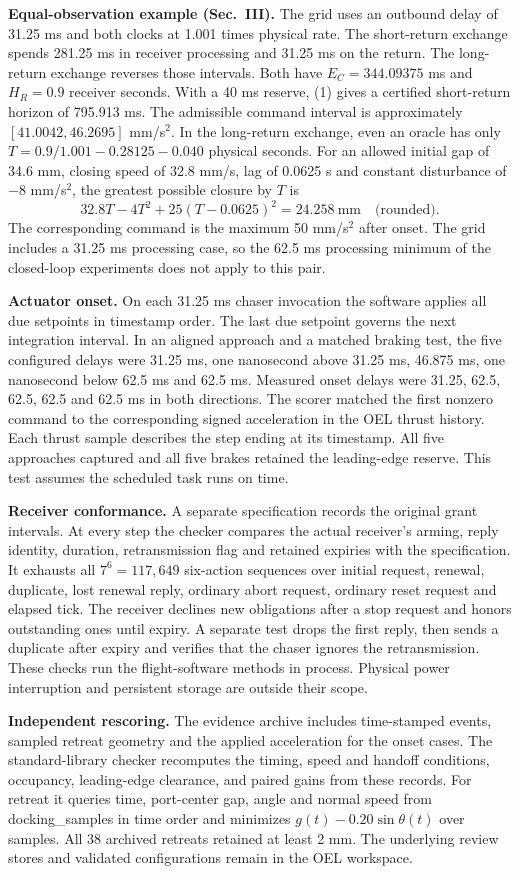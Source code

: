 \documentclass[10pt,letterpaper]{article}
\begin{document}
\textbf{Equal-observation example (Sec.~III).} The grid uses an outbound delay of 31.25 ms and both clocks at 1.001 times physical rate. The short-return exchange spends 281.25 ms in receiver processing and 31.25 ms on the return. The long-return exchange reverses those intervals. Both have $E_C=344.09375$ ms and $H_R=0.9$ receiver seconds. With a 40 ms reserve, (1) gives a certified short-return horizon of 795.913 ms. The admissible command interval is approximately $[41.0042,46.2695]$ mm/s$^2$. In the long-return exchange, even an oracle has only $T=0.9/1.001-0.28125-0.040$ physical seconds. For an allowed initial gap of 34.6 mm, closing speed of 32.8 mm/s, lag of 0.0625 s and constant disturbance of $-8$ mm/s$^2$, the greatest possible closure by $T$ is
\[
32.8T-4T^2+25(T-0.0625)^2=24.258~\mathrm{mm}\quad\text{(rounded)}.
\]
The corresponding command is the maximum 50 mm/s$^2$ after onset. The grid includes a 31.25 ms processing case, so the 62.5 ms processing minimum of the closed-loop experiments does not apply to this pair.

\textbf{Actuator onset.} On each 31.25 ms chaser invocation the software applies all due setpoints in timestamp order. The last due setpoint governs the next integration interval. In an aligned approach and a matched braking test, the five configured delays were 31.25 ms, one nanosecond above 31.25 ms, 46.875 ms, one nanosecond below 62.5 ms and 62.5 ms. Measured onset delays were 31.25, 62.5, 62.5, 62.5 and 62.5 ms in both directions. The scorer matched the first nonzero command to the corresponding signed acceleration in the OEL thrust history. Each thrust sample describes the step ending at its timestamp. All five approaches captured and all five brakes retained the leading-edge reserve. This test assumes the scheduled task runs on time.

\textbf{Receiver conformance.} A separate specification records the original grant intervals. At every step the checker compares the actual receiver's arming, reply identity, duration, retransmission flag and retained expiries with the specification. It exhausts all $7^6=117{,}649$ six-action sequences over initial request, renewal, duplicate, lost renewal reply, ordinary abort request, ordinary reset request and elapsed tick. The receiver declines new obligations after a stop request and honors outstanding ones until expiry. A separate test drops the first reply, then sends a duplicate after expiry and verifies that the chaser ignores the retransmission. These checks run the flight-software methods in process. Physical power interruption and persistent storage are outside their scope.

\textbf{Independent rescoring.} The evidence archive includes time-stamped events, sampled retreat geometry and the applied acceleration for the onset cases. The standard-library checker recomputes the timing, speed and handoff conditions, occupancy, leading-edge clearance, and paired gains from these records. For retreat it queries time, port-center gap, angle and normal speed from \textsf{docking\_samples} in time order and minimizes $g(t)-0.20\sin\theta(t)$ over samples. All 38 archived retreats retained at least 2 mm. The underlying review stores and validated configurations remain in the OEL workspace.
\end{document}

